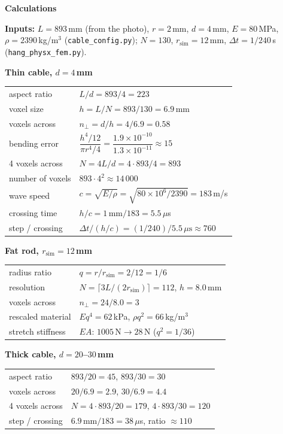 \documentclass[10pt,a4paper]{article}
\newcommand{\panel}[1]{{\small\bfseries #1}}
\begin{document}
\vspace{-2pt}
\panel{Calculations}

{\small
\textbf{Inputs:} $L=893$\,mm (from the photo), $r=2$\,mm, $d=4$\,mm, $E=80$\,MPa,
$\rho=2390$\,kg/m$^3$ (\texttt{cable\_config.py}); $N=130$, $r_\text{sim}=12$\,mm,
$\Delta t=1/240$\,s (\texttt{hang\_physx\_fem.py}).}

\vspace{2pt}
\renewcommand{\arraystretch}{1.25}
{\small
\begin{minipage}[t]{0.50\linewidth}
\textbf{Thin cable, $d=4$\,mm}\\[1pt]
\begin{tabular}{@{}l@{\quad}l@{}}
aspect ratio & $L/d = 893/4 = 223$ \\
voxel size & $h = L/N = 893/130 = 6.9$\,mm \\
voxels across & $n_\perp = d/h = 4/6.9 = 0.58$ \\
bending error & $\dfrac{h^4/12}{\pi r^4/4} = \dfrac{1.9\times10^{-10}}{1.3\times10^{-11}} \approx 15$ \\[6pt]
4 voxels across & $N = 4L/d = 4\cdot893/4 = 893$ \\
number of voxels & $893\cdot4^2 \approx 14\,000$ \\
wave speed & $c=\sqrt{E/\rho}=\sqrt{80\times10^{6}/2390}=183$\,m/s \\
crossing time & $h/c = 1\,\text{mm}/183 = 5.5\,\mu$s \\
step / crossing & $\Delta t/(h/c) = (1/240)/5.5\,\mu\text{s} \approx 760$ \\
\end{tabular}
\end{minipage}\hfill
\begin{minipage}[t]{0.48\linewidth}
\textbf{Fat rod, $r_\text{sim}=12$\,mm}\\[1pt]
\begin{tabular}{@{}l@{\quad}l@{}}
radius ratio & $q = r/r_\text{sim} = 2/12 = 1/6$ \\
resolution & $N=\lceil 3L/(2r_\text{sim})\rceil = 112$,\; $h = 8.0$\,mm \\
voxels across & $n_\perp = 24/8.0 = 3$ \\
rescaled material & $E q^4 = 62$\,kPa,\; $\rho q^2 = 66$\,kg/m$^3$ \\
stretch stiffness & $EA$: $1005\,\text{N} \to 28\,\text{N}$ \;($q^2 = 1/36$) \\
\end{tabular}

\vspace{3pt}
\textbf{Thick cable, $d=20$--$30$\,mm}\\[1pt]
\begin{tabular}{@{}l@{\quad}l@{}}
aspect ratio & $893/20 = 45$,\; $893/30 = 30$ \\
voxels across & $20/6.9 = 2.9$,\; $30/6.9 = 4.4$ \\
4 voxels across & $N = 4\cdot893/20 = 179$,\; $4\cdot893/30 = 120$ \\
step / crossing & $6.9\,\text{mm}/183 = 38\,\mu$s,\; ratio $\approx 110$ \\
\end{tabular}
\end{minipage}}
\end{document}
